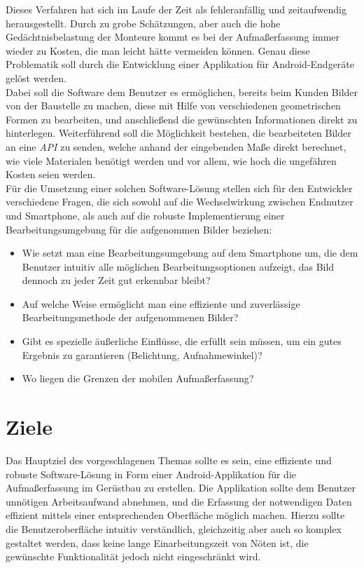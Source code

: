 \documentclass[a4paper]{article}
\begin{document}
Dieses Verfahren hat sich im Laufe der Zeit als fehleranfällig und zeitaufwendig herausgestellt.
Durch zu grobe Schätzungen, aber auch die hohe Gedächtnisbelastung der Monteure kommt es bei der Aufmaßerfassung immer wieder zu Kosten, die man leicht hätte vermeiden können.
Genau diese Problematik soll durch die Entwicklung einer Applikation für Android-Endgeräte gelöst werden. \\

Dabei soll die Software dem Benutzer es ermöglichen, bereits beim Kunden Bilder von der Baustelle zu machen, diese mit Hilfe von verschiedenen geometrischen Formen zu bearbeiten, und anschließend die gewünschten Informationen direkt zu hinterlegen.
Weiterführend soll die Möglichkeit bestehen, die bearbeiteten Bilder an eine \textit{API} zu senden, welche anhand der eingebenden Maße direkt berechnet, wie viele Materialen benötigt werden und vor allem, wie hoch die ungefähren Kosten seien werden.\\

Für die Umsetzung einer solchen Software-Lösung stellen sich für den Entwickler verschiedene Fragen, die sich sowohl auf die Wechselwirkung zwischen Endnutzer und Smartphone, als auch auf die robuste Implementierung einer Bearbeitungsumgebung für die aufgenommen Bilder beziehen: \\

\begin{itemize}
	\item Wie setzt man eine Bearbeitungsumgebung auf dem Smartphone um, die dem Benutzer intuitiv alle möglichen Bearbeitungsoptionen aufzeigt, das Bild dennoch zu jeder Zeit gut erkennbar bleibt?
	\item Auf welche Weise ermöglicht man eine effiziente und zuverlässige Bearbeitungsmethode der aufgenommenen Bilder?
	\item Gibt es spezielle äußerliche Einflüsse, die erfüllt sein müssen, um ein gutes Ergebnis zu garantieren (Belichtung, Aufnahmewinkel)?
	\item Wo liegen die Grenzen der mobilen Aufmaßerfassung?
\end{itemize}

\newpage

\section*{Ziele}
Das Hauptziel des vorgeschlagenen Themas sollte es sein, eine effiziente und robuste Software-Lösung in Form einer Android-Applikation für die Aufmaßerfassung im Gerüstbau zu erstellen. 
Die Applikation sollte dem Benutzer unnötigen Arbeitsaufwand abnehmen, und die Erfassung der notwendigen Daten effizient mittels einer entsprechenden Oberfläche möglich machen.
Hierzu sollte die Benutzeroberfläche intuitiv verständlich, gleichzeitig aber auch so komplex gestaltet werden, dass keine lange Einarbeitungszeit von Nöten ist, die gewünschte Funktionalität jedoch nicht eingeschränkt wird.
\end{document}
